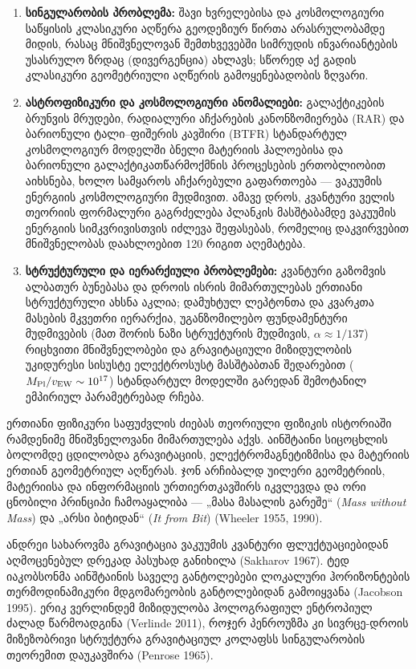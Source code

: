 \documentclass[11pt,a4paper]{article}
\begin{document}
\begin{enumerate}[label=\arabic*.]
\item \textbf{სინგულარობის პრობლემა:} შავი ხვრელებისა და კოსმოლოგიური საწყისის კლასიკური აღწერა გეოდეზიურ წირთა არასრულობამდე მიდის, რასაც მნიშვნელოვან შემთხვევებში სიმრუდის ინვარიანტების უსასრულო ზრდაც (დივერგენცია) ახლავს; სწორედ აქ გადის კლასიკური გეომეტრიული აღწერის გამოყენებადობის ზღვარი.
\item \textbf{ასტროფიზიკური და კოსმოლოგიური ანომალიები:} გალაქტიკების ბრუნვის მრუდები, რადიალური აჩქარების კანონზომიერება (RAR) და ბარიონული ტალი–ფიშერის კავშირი (BTFR) სტანდარტულ კოსმოლოგიურ მოდელში ბნელი მატერიის ჰალოებისა და ბარიონული გალაქტიკათწარმოქმნის პროცესების ერთობლიობით აიხსნება, ხოლო სამყაროს აჩქარებული გაფართოება — ვაკუუმის ენერგიის კოსმოლოგიური მუდმივით. ამავე დროს, კვანტური ველის თეორიის ფორმალური გაგრძელება პლანკის მასშტაბამდე ვაკუუმის ენერგიის სიმკვრივისთვის იძლევა შეფასებას, რომელიც დაკვირვებით მნიშვნელობას დაახლოებით 120 რიგით აღემატება.
\item \textbf{სტრუქტურული და იერარქიული პრობლემები:} კვანტური გაზომვის ალბათურ ბუნებასა და დროის ისრის მიმართულებას ერთიანი სტრუქტურული ახსნა აკლია; დამუხტულ ლეპტონთა და კვარკთა მასების მკვეთრი იერარქია, უგანზომილებო ფუნდამენტური მუდმივების (მათ შორის ნაზი სტრუქტურის მუდმივის, $\alpha \approx 1/137$) რიცხვითი მნიშვნელობები და გრავიტაციული მიზიდულობის უკიდურესი სისუსტე ელექტროსუსტ მასშტაბთან შედარებით ($M_{\rm Pl}/v_{\rm EW} \sim 10^{17}$) სტანდარტულ მოდელში გარედან შემოტანილ ემპირიულ პარამეტრებად რჩება.

\end{enumerate}
ერთიანი ფიზიკური საფუძვლის ძიებას თეორიული ფიზიკის ისტორიაში რამდენიმე მნიშვნელოვანი მიმართულება აქვს. აინშტაინი სიცოცხლის ბოლომდე ცდილობდა გრავიტაციის, ელექტრომაგნეტიზმისა და მატერიის ერთიან გეომეტრიულ აღწერას. ჯონ არჩიბალდ უილერი გეომეტრიის, მატერიისა და ინფორმაციის ურთიერთკავშირს იკვლევდა და ორი ცნობილი პრინციპი ჩამოაყალიბა — „მასა მასალის გარეშე“ (\emph{Mass without Mass}) და „არსი ბიტიდან“ (\emph{It from Bit}) (Wheeler 1955, 1990).

ანდრეი სახაროვმა გრავიტაცია ვაკუუმის კვანტური ფლუქტუაციებიდან აღმოცენებულ დრეკად პასუხად განიხილა (Sakharov 1967). ტედ იაკობსონმა აინშტაინის საველე განტოლებები ლოკალური ჰორიზონტების თერმოდინამიკური მდგომარეობის განტოლებიდან გამოიყვანა (Jacobson 1995). ერიკ ვერლინდემ მიზიდულობა ჰოლოგრაფიულ ენტროპიულ ძალად წარმოადგინა (Verlinde 2011), როჯერ პენროუზმა კი სივრცე-დროის მიზეზობრივი სტრუქტურა გრავიტაციულ კოლაფსს სინგულარობის თეორემით დაუკავშირა (Penrose 1965).
\end{document}
